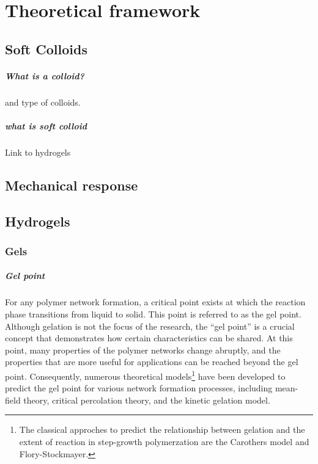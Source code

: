 \chapter{Theoretical framework}\label{ch2:Theoframework}



\section{Soft Colloids}

\paragraph{What is a colloid?} and type of colloids.

\paragraph{what is soft colloid} Link to hydrogels



\section{Mechanical response}

\section{Hydrogels}

\subsection{Gels}

\paragraph{Gel point} For any polymer network formation, a critical point exists at which the reaction phase transitions from liquid to solid. 
This point is referred to as the gel point.
Although gelation is not the focus of the research, the ``gel point'' is a crucial concept that demonstrates how certain characteristics can be shared.
At this point, many properties of the polymer networks change abruptly, and the properties that are more useful for applications can be reached beyond the gel point.
Consequently, numerous theoretical models\footnote{The classical approches to predict the relationship between gelation and the extent of reaction in step-growth polymerzation are the Carothers model and Flory-Stockmayer\citep{guPolymerNetworksPlastics2020}.} have been developed to predict the gel point for various network formation processes, including mean-field theory, critical percolation theory, and the kinetic gelation model\citep{guPolymerNetworksPlastics2020}.

